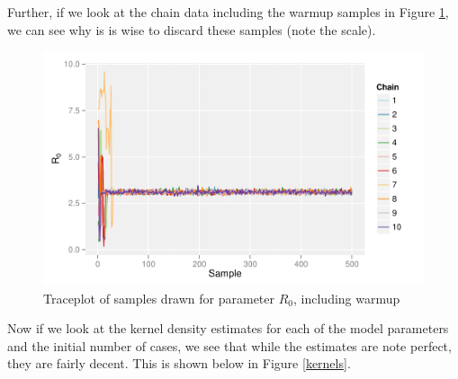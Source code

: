 \documentclass[12pt]{article}
\begin{document}
    Further, if we look at the chain data including the warmup samples in Figure \ref{traceplot2}, we can see why is is wise to discard these samples (note the scale).

    \begin{figure}[H]
        \centering
        \includegraphics[width=\textwidth]{./images/traceplotR0_inc.pdf}
        \caption{Traceplot of samples drawn for parameter $R_0$, including warmup}
        \label{traceplot2}
    \end{figure}

    Now if we look at the kernel density estimates for each of the model parameters and the initial number of cases, we see that while the estimates are note perfect, they are fairly decent. This is shown below in Figure \ref{kernels}.
\end{document}
